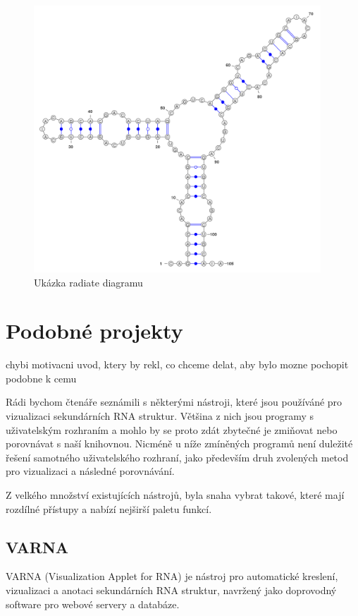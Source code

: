 \begin{figure}[H]
  \centering
  \includegraphics[height=100mm]{../img/kap01/radiate.png}
  \caption{Ukázka radiate diagramu}
\end{figure}

\section{Podobné projekty} {\color{red} chybi motivacni uvod, ktery by rekl, co chceme delat, aby bylo mozne pochopit podobne k cemu}

Rádi bychom čtenáře seznámili s některými nástroji, které jsou používáné pro
vizualizaci sekundárních RNA struktur. Většina z nich jsou programy s
uživatelským rozhraním a mohlo by se proto zdát zbytečné je zmiňovat nebo
porovnávat s naší knihovnou. Nicméně u níže zmíněných programů není duležité
řešení samotného uživatelského rozhraní, jako především druh zvolených metod
pro vizualizaci a následné porovnávání.

Z velkého množství existujících nástrojů, byla snaha vybrat takové,
které mají rozdílné přístupy a nabízí nejširší paletu funkcí.

\subsection{VARNA} 

VARNA (Visualization Applet for RNA) je nástroj pro automatické
kreslení, vizualizaci a anotaci sekundárních RNA struktur, navržený jako
doprovodný software pro webové servery a databáze.

